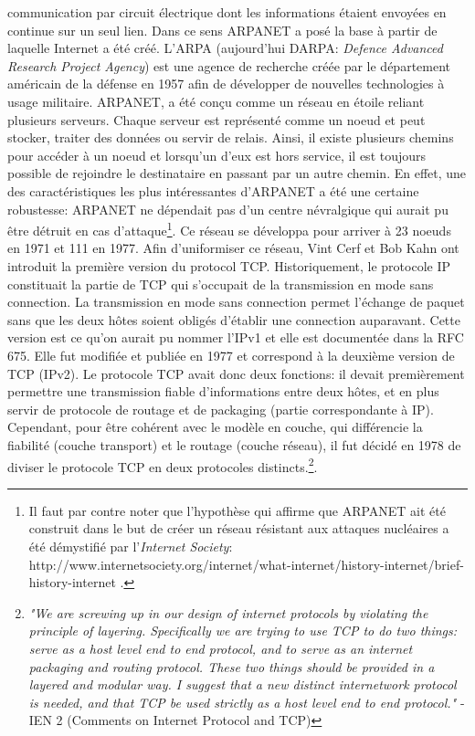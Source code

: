 communication par circuit électrique dont les informations étaient envoyées en
continue sur un seul lien. Dans ce sens ARPANET a posé la base à partir de 
laquelle Internet a été créé. 
\smallbreak
L'ARPA (aujourd'hui DARPA: {\it Defence Advanced Research Project Agency}) est
une agence de recherche créée par le département américain de la défense en
1957 afin de développer de nouvelles technologies à usage militaire. ARPANET,
a été conçu comme un réseau en étoile reliant plusieurs serveurs.
Chaque serveur est représenté comme un noeud et peut stocker, traiter des données ou servir de relais.
Ainsi, il existe plusieurs chemins pour accéder à un noeud et lorsqu'un d'eux
est hors service, il est toujours possible de rejoindre le destinataire
en passant par un autre chemin. En effet, une des caractéristiques les plus intéressantes
d'ARPANET a été une certaine robustesse: ARPANET ne dépendait pas d'un centre
névralgique qui aurait pu être détruit en cas d'attaque\footnote { Il faut par
contre noter que l'hypothèse qui affirme que ARPANET ait été construit dans le
but de créer un réseau résistant aux attaques nucléaires a été démystifié par
l'{\it Internet Society}:
http://www.internetsociety.org/internet/what-internet/history-internet/brief-history-internet
.}.
\smallbreak
Ce réseau se développa pour arriver à 23 noeuds en 1971 et 111 en 1977.
Afin d'uniformiser ce réseau, Vint Cerf et Bob Kahn ont introduit la première
version du protocol TCP.  Historiquement, le protocole IP constituait la
partie de TCP qui s'occupait de la transmission en mode sans connection.
La transmission en mode sans connection permet l'échange de paquet sans que les
deux hôtes soient obligés d'établir une connection auparavant.
Cette version est ce qu'on aurait pu nommer l'IPv1 et elle est documentée dans
la RFC 675. Elle fut modifiée et publiée en 1977 et correspond à la
deuxième version de TCP (IPv2). 
\smallbreak
Le protocole TCP avait donc deux fonctions: il devait premièrement
permettre une transmission fiable d'informations entre deux hôtes, et en plus
servir de protocole de routage et de packaging (partie correspondante à IP).
Cependant, pour être cohérent avec le modèle en couche, qui différencie la fiabilité
(couche transport) et le routage (couche réseau), il fut décidé en 1978 de
diviser le protocole TCP en deux protocoles distincts.\footnote {
{\it "We are screwing up in our design of internet protocols by violating the
principle of layering. Specifically we are trying to use TCP to do two
things: serve as a host level end to end protocol, and to serve as an
internet packaging and routing protocol. These two things should be
provided in a layered and modular way. I suggest that a new distinct
internetwork protocol is needed, and that TCP be used strictly as a host
level end to end protocol." } - IEN 2 (Comments on Internet Protocol and TCP)
}.

